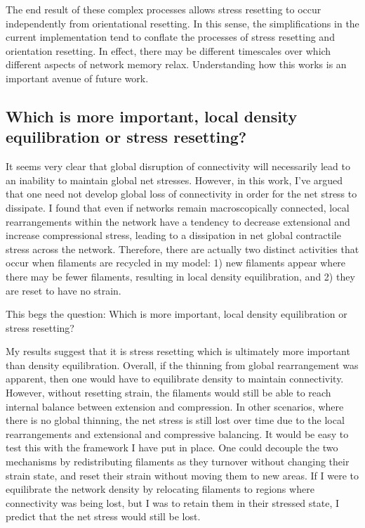 The end result of these complex processes allows stress resetting to occur independently from orientational resetting.  In this sense, the simplifications in the current implementation tend to conflate the processes of stress resetting and orientation resetting. In effect, there may be different timescales over which different aspects of network memory relax.  Understanding how this works is  an important avenue of future work.


\subsection{Which is more important, local density equilibration or stress resetting?}
It seems very clear that  global disruption of connectivity will necessarily lead to an inability to maintain global net stresses.  However, in this work, I've argued that one need not develop global loss of connectivity in order for the net stress to dissipate. I found that even if networks remain macroscopically connected,  local rearrangements within the network have a tendency to decrease extensional and increase compressional stress, leading to a dissipation in net global contractile stress across the network.   Therefore, there are actually two distinct activities that occur when filaments are recycled in my model: 1) new filaments appear where there may be fewer filaments, resulting in local density equilibration, and 2) they are reset to have no strain.  

This begs the question: Which is more important, local density equilibration or stress resetting?

My results suggest that it is stress resetting which is ultimately more important than density equilibration.  Overall, if the thinning from global rearrangement was apparent, then one would have to equilibrate density to maintain connectivity.  However, without resetting strain, the filaments would still be able to reach internal balance between extension and compression.  In other scenarios, where there is no global thinning, the net stress is still lost over time due to the local rearrangements and extensional and compressive balancing. It would be easy to test this with the framework I have put in place.  One could decouple the two mechanisms by redistributing filaments as they turnover without changing their strain state, and  reset their strain without moving them to new areas.  If I were to equilibrate the network density by relocating filaments to regions where connectivity was being lost, but I was to retain them in their stressed state, I predict that the net stress would still be lost.  

